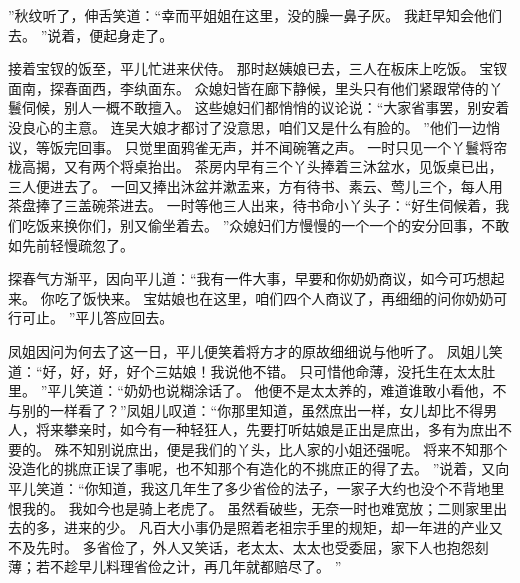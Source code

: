 ”秋纹听了，伸舌笑道：“幸而平姐姐在这里，没的臊一鼻子灰。
我赶早知会他们去。
”说着，便起身走了。
\par
接着宝钗的饭至，平儿忙进来伏侍。
那时赵姨娘已去，三人在板床上吃饭。
宝钗面南，探春面西，李纨面东。
众媳妇皆在廊下静候，里头只有他们紧跟常侍的丫鬟伺候，别人一概不敢擅入。
这些媳妇们都悄悄的议论说：“大家省事罢，别安着没良心的主意。
连吴大娘才都讨了没意思，咱们又是什么有脸的。
”他们一边悄议，等饭完回事。
只觉里面鸦雀无声，并不闻碗箸之声。
一时只见一个丫鬟将帘栊高揭，又有两个将桌抬出。
茶房内早有三个丫头捧着三沐盆水，见饭桌已出，三人便进去了。
一回又捧出沐盆并漱盂来，方有待书、素云、莺儿三个，每人用茶盘捧了三盖碗茶进去。
一时等他三人出来，待书命小丫头子：“好生伺候着，我们吃饭来换你们，别又偷坐着去。
”众媳妇们方慢慢的一个一个的安分回事，不敢如先前轻慢疏忽了。
\par
探春气方渐平，因向平儿道：“我有一件大事，早要和你奶奶商议，如今可巧想起来。
你吃了饭快来。
宝姑娘也在这里，咱们四个人商议了，再细细的问你奶奶可行可止。
”平儿答应回去。
\par
凤姐因问为何去了这一日，平儿便笑着将方才的原故细细说与他听了。
凤姐儿笑道：“好，好，好，好个三姑娘！我说他不错。
只可惜他命薄，没托生在太太肚里。
”平儿笑道：“奶奶也说糊涂话了。
他便不是太太养的，难道谁敢小看他，不与别的一样看了？”凤姐儿叹道：“你那里知道，虽然庶出一样，女儿却比不得男人，将来攀亲时，如今有一种轻狂人，先要打听姑娘是正出是庶出，多有为庶出不要的。
殊不知别说庶出，便是我们的丫头，比人家的小姐还强呢。
将来不知那个没造化的挑庶正误了事呢，也不知那个有造化的不挑庶正的得了去。
”说着，又向平儿笑道：“你知道，我这几年生了多少省俭的法子，一家子大约也没个不背地里恨我的。
我如今也是骑上老虎了。
虽然看破些，无奈一时也难宽放；二则家里出去的多，进来的少。
凡百大小事仍是照着老祖宗手里的规矩，却一年进的产业又不及先时。
多省俭了，外人又笑话，老太太、太太也受委屈，家下人也抱怨刻薄；若不趁早儿料理省俭之计，再几年就都赔尽了。
”\par
